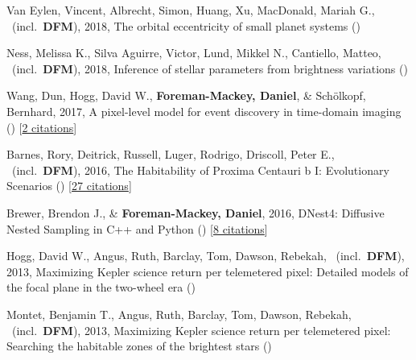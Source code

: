 \item[{\color{numcolor}\scriptsize7}] Van Eylen, Vincent, Albrecht, Simon, Huang, Xu, MacDonald, Mariah G., \etal\ (incl.\ \textbf{DFM}), 2018, The orbital eccentricity of small planet systems ()

\item[{\color{numcolor}\scriptsize6}] Ness, Melissa K., Silva Aguirre, Victor, Lund, Mikkel N., Cantiello, Matteo, \etal\ (incl.\ \textbf{DFM}), 2018, Inference of stellar parameters from brightness variations ()

\item[{\color{numcolor}\scriptsize5}] Wang, Dun, Hogg, David W., \textbf{Foreman-Mackey, Daniel}, \& Sch{\"o}lkopf, Bernhard, 2017, A pixel-level model for event discovery in time-domain imaging () [\href{http://adsabs.harvard.edu/abs/2017arXiv171002428W}{2 citations}]

\item[{\color{numcolor}\scriptsize4}] Barnes, Rory, Deitrick, Russell, Luger, Rodrigo, Driscoll, Peter E., \etal\ (incl.\ \textbf{DFM}), 2016, The Habitability of Proxima Centauri b I: Evolutionary Scenarios () [\href{http://adsabs.harvard.edu/abs/2016arXiv160806919B}{27 citations}]

\item[{\color{numcolor}\scriptsize3}] Brewer, Brendon J., \& \textbf{Foreman-Mackey, Daniel}, 2016, DNest4: Diffusive Nested Sampling in C++ and Python () [\href{http://adsabs.harvard.edu/abs/2016arXiv160603757B}{8 citations}]

\item[{\color{numcolor}\scriptsize2}] Hogg, David W., Angus, Ruth, Barclay, Tom, Dawson, Rebekah, \etal\ (incl.\ \textbf{DFM}), 2013, Maximizing Kepler science return per telemetered pixel: Detailed models of the focal plane in the two-wheel era ()

\item[{\color{numcolor}\scriptsize1}] Montet, Benjamin T., Angus, Ruth, Barclay, Tom, Dawson, Rebekah, \etal\ (incl.\ \textbf{DFM}), 2013, Maximizing Kepler science return per telemetered pixel: Searching the habitable zones of the brightest stars ()